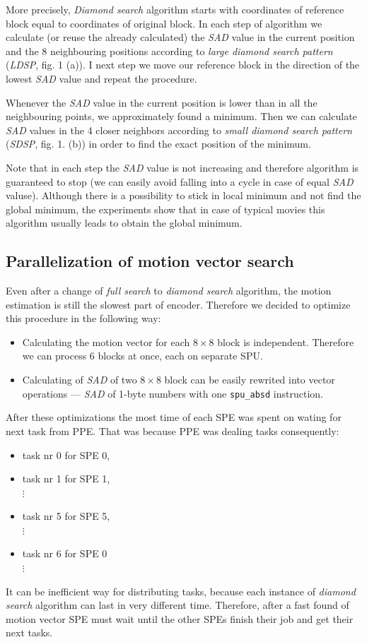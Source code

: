 \documentclass[11pt]{article}
\begin{document}
More precisely, \emph{Diamond search} algorithm starts with coordinates of 
reference block equal to coordinates of original block.
In each step of algorithm we calculate
(or reuse the already calculated) the \emph{SAD} value in the current
position and the 8 neighbouring positions according to \emph{large diamond
search pattern} (\emph{LDSP}, fig. 1 (a)).
I next step we move our reference block in the direction of the lowest 
\emph{SAD} value and repeat the procedure.

Whenever the \emph{SAD} value in the current position is lower than
in all the neighbouring points, we approximately found a minimum.
Then we can calculate \emph{SAD} values in the 4 closer neighbors 
according to \emph{small diamond search pattern} (\emph{SDSP}, fig. 1. (b))
in order to find the exact position of the minimum.

Note that in each step the \emph{SAD} value is not increasing and therefore
algorithm is guaranteed to stop (we can easily avoid falling into a cycle
in case of equal \emph{SAD} valuse).
Although there is a possibility to stick in local minimum and not find the
global minimum,
the experiments\cite{ds} show that in case of typical movies this algorithm
usually leads to obtain the global minimum.

\subsection{Parallelization of motion vector search}
Even after a change of \emph{full search} to \emph{diamond search}
algorithm, the motion estimation is still the slowest part of encoder.
Therefore we decided to optimize this procedure in the following way:
\begin{itemize}
\item
Calculating the motion vector for each $8 \times 8$ block is independent. 
Therefore we can process 6 blocks at once, each on separate SPU.
\item
Calculating of \emph{SAD} of two $8 \times 8$ block can be easily rewrited into 
vector operations --- \emph{SAD} of 1-byte numbers with one \texttt{spu\_absd}
instruction.
\end{itemize}
After these optimizations the most time of each SPE was spent on wating for next
task from PPE.
That was because PPE was dealing tasks consequently:
\begin{itemize}
\item task nr 0 for SPE 0, 
\item task nr 1 for SPE 1,\\
 $\vdots$
\item task nr 5 for SPE 5,\\
$\vdots$
\item task nr 6 for SPE 0\\
$\vdots$
\end{itemize}
It can be inefficient way for distributing tasks, because each instance
of \emph{diamond search} algorithm can last in very different time.
Therefore, after a fast found of motion vector SPE must wait until the other
SPEs finish their job and get their next tasks.
\end{document}
